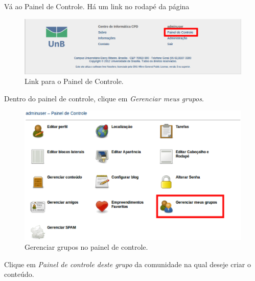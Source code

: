 Vá ao Painel de Controle. Há um link no rodapé da página

\begin{figure}[H]
  \centering
    \includegraphics[keepaspectratio=true,scale=0.49]{figuras/linkPainelControle.eps} 
  \caption{Link para o Painel de Controle.}
  \label{fig:linkPainelControle}
\end{figure}

\newpage
Dentro do painel de controle, clique em \emph{Gerenciar meus grupos}.

\begin{figure}[H]
  \centering
    \includegraphics[keepaspectratio=true,scale=0.49]{figuras/painelDeControle.eps}
  \caption{Gerenciar grupos no painel de controle.}
  \label{fig:GerGrupPainelControle}
\end{figure}

Clique em \emph{Painel de controle deste grupo} da comunidade na qual deseje criar o conteúdo.

